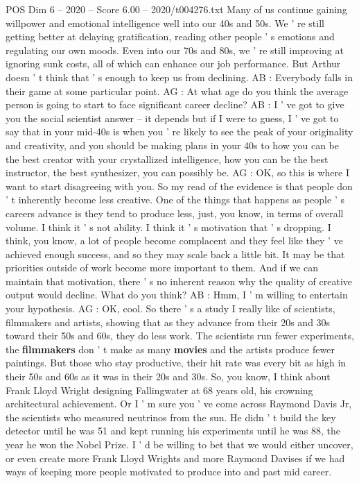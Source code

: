 \begin{textsample}{POS Dim 6 – 2020 – Score 6.00 – 2020/t004276.txt}
Many of us continue gaining willpower and emotional intelligence well into our 40s and 50s.
We ' re still getting better at delaying gratification, reading other people ' s emotions and regulating our own moods.
Even into our 70s and 80s, we ' re still improving at ignoring sunk costs, all of which can enhance our job performance.
But Arthur doesn ' t think that ' s enough to keep us from declining.
AB : Everybody falls in their game at some particular point.
AG : At what age do you think the average person is going to start to face significant career decline?
AB : I ' ve got to give you the social scientist answer -- it depends but if I were to guess, I ' ve got to say that in your mid-40s is when you ' re likely to see the peak of your originality and creativity, and you should be making plans in your 40s to how you can be the best creator with your crystallized intelligence, how you can be the best instructor, the best synthesizer, you can possibly be.
AG : OK, so this is where I want to start disagreeing with you.
So my read of the evidence is that people don ' t inherently become less creative.
One of the things that happens as people ' s careers advance is they tend to produce less, just, you know, in terms of overall volume.
I think it ' s not ability.
I think it ' s motivation that ' s dropping.
I think, you know, a lot of people become complacent and they feel like they ' ve achieved enough success, and so they may scale back a little bit.
It may be that priorities outside of work become more important to them.
And if we can maintain that motivation, there ' s no inherent reason why the quality of creative output would decline.
What do you think?
AB : Hmm, I ' m willing to entertain your hypothesis.
AG : OK, cool.
So there ' s a study I really like of scientists, filmmakers and artists, showing that as they advance from their 20s and 30s toward their 50s and 60s, they do less work.
The scientists run fewer experiments, the \textbf{filmmakers} don ' t make as many \textbf{movies} and the artists produce fewer paintings.
But those who stay productive, their hit rate was every bit as high in their 50s and 60s as it was in their 20s and 30s.
So, you know, I think about Frank Lloyd Wright designing Fallingwater at 68 years old, his crowning architectural achievement.
Or I ' m sure you ' ve come across Raymond Davis Jr, the scientists who measured neutrinos from the sun.
He didn ' t build the key detector until he was 51 and kept running his experiments until he was 88, the year he won the Nobel Prize.
I ' d be willing to bet that we would either uncover, or even create more Frank Lloyd Wrights and more Raymond Davises if we had ways of keeping more people motivated to produce into and past mid career.

\end{textsample}
